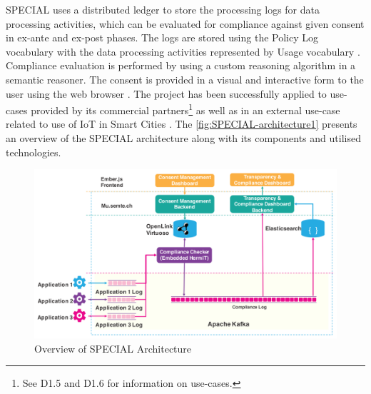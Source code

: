 SPECIAL uses a distributed ledger to store the processing logs for data processing activities, which can be evaluated for compliance against given consent in ex-ante and ex-post phases. The logs are stored using the  Policy Log vocabulary \cite{bonatti_special_2018-1} with the data processing activities represented by Usage vocabulary \cite{bonatti_special_2018-2}. Compliance evaluation is performed by using a custom reasoning algorithm \cite{bonatti_fast_2018,bonatti_richer_2019} in a semantic reasoner. The consent is provided in a visual and interactive form to the user using the web browser \cite{drozd_consent_2019,gritzalis_i_2019}. The project has been successfully applied to use-cases provided by its commercial partners\footnote{See D1.5 \cite{bonatti_d1.5_2018} and D1.6 \cite{schlehahn_d1.6_2018} for information on use-cases.} as well as in an external use-case related to use of IoT in Smart Cities \cite{fernandez_user_2019}. The \autoref{fig:SPECIAL-architecture1} presents an overview of the SPECIAL architecture along with its components and utilised technologies.
\begin{figure}[htbp]
    \centering
    \includegraphics[width=\linewidth]{img/SPECIAL_architecture1.png}
    \caption{Overview of SPECIAL Architecture \cite{kirrane_scalable_2018}}
    \label{fig:SPECIAL-architecture1}
\end{figure}

